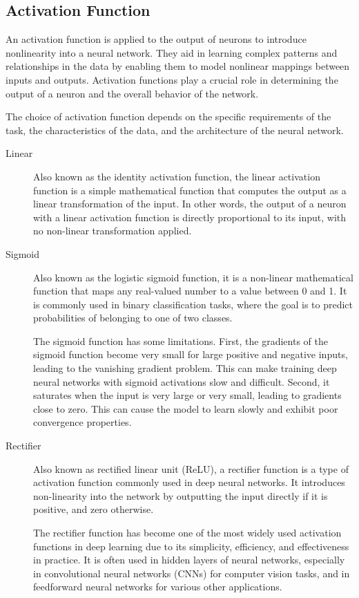 \documentclass[a4paper]{article}
\begin{document}
\subsection*{Activation Function}
An activation function is applied to the output of neurons to introduce nonlinearity into a neural network. They aid in learning complex patterns and relationships in the data by enabling them to model nonlinear mappings between inputs and outputs. Activation functions play a crucial role in determining the output of a neuron and the overall behavior of the network. 

The choice of activation function depends on the specific requirements of the task, the characteristics of the data, and the architecture of the neural network.

\begin{description}
\item[Linear]
Also known as the identity activation function, the linear activation function is a simple mathematical function that computes the output as a linear transformation of the input. In other words, the output of a neuron with a linear activation function is directly proportional to its input, with no non-linear transformation applied.

\item[Sigmoid]
Also known as the logistic sigmoid function, it is a non-linear mathematical function that maps any real-valued number to a value between 0 and 1. It is commonly used in binary classification tasks, where the goal is to predict probabilities of belonging to one of two classes.

The sigmoid function has some limitations. First, the gradients of the sigmoid function become very small for large positive and negative inputs, leading to the vanishing gradient problem. This can make training deep neural networks with sigmoid activations slow and difficult. Second, it saturates when the input is very large or very small, leading to gradients close to zero. This can cause the model to learn slowly and exhibit poor convergence properties.

\item[Rectifier]
Also known as rectified linear unit (ReLU), a rectifier function is a type of activation function commonly used in deep neural networks. It introduces non-linearity into the network by outputting the input directly if it is positive, and zero otherwise.

The rectifier function has become one of the most widely used activation functions in deep learning due to its simplicity, efficiency, and effectiveness in practice. It is often used in hidden layers of neural networks, especially in convolutional neural networks (CNNs) for computer vision tasks, and in feedforward neural networks for various other applications.


\end{description}
\end{document}
